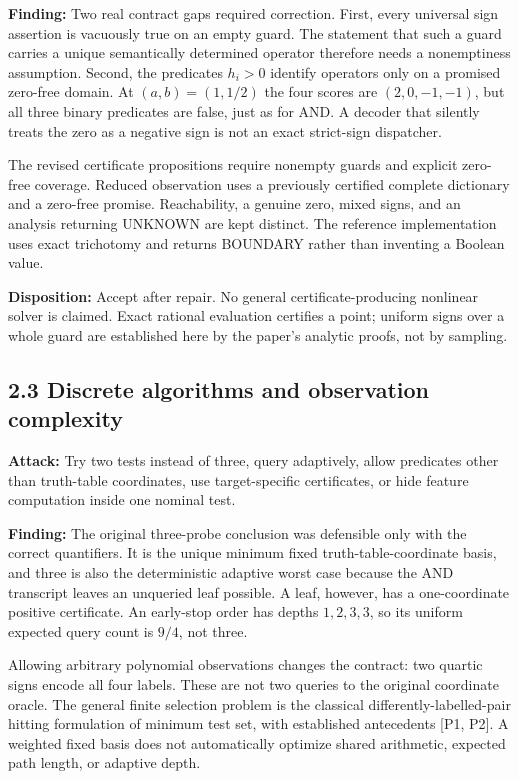 \documentclass[
  11pt,
]{article}
\begin{document}
\textbf{Finding:} Two real contract gaps required correction. First,
every universal sign assertion is vacuously true on an empty guard. The
statement that such a guard carries a unique semantically determined
operator therefore needs a nonemptiness assumption. Second, the
predicates \(h_i>0\) identify operators only on a promised zero-free
domain. At \((a,b)=(1,1/2)\) the four scores are \((2,0,-1,-1)\), but
all three binary predicates are false, just as for AND. A decoder that
silently treats the zero as a negative sign is not an exact strict-sign
dispatcher.

The revised certificate propositions require nonempty guards and
explicit zero-free coverage. Reduced observation uses a previously
certified complete dictionary and a zero-free promise. Reachability, a
genuine zero, mixed signs, and an analysis returning UNKNOWN are kept
distinct. The reference implementation uses exact trichotomy and returns
BOUNDARY rather than inventing a Boolean value.

\textbf{Disposition:} Accept after repair. No general
certificate-producing nonlinear solver is claimed. Exact rational
evaluation certifies a point; uniform signs over a whole guard are
established here by the paper's analytic proofs, not by sampling.

\subsection{2.3 Discrete algorithms and observation
complexity}\label{discrete-algorithms-and-observation-complexity}

\textbf{Attack:} Try two tests instead of three, query adaptively, allow
predicates other than truth-table coordinates, use target-specific
certificates, or hide feature computation inside one nominal test.

\textbf{Finding:} The original three-probe conclusion was defensible
only with the correct quantifiers. It is the unique minimum fixed
truth-table-coordinate basis, and three is also the deterministic
adaptive worst case because the AND transcript leaves an unqueried leaf
possible. A leaf, however, has a one-coordinate positive certificate. An
early-stop order has depths \(1,2,3,3\), so its uniform expected query
count is \(9/4\), not three.

Allowing arbitrary polynomial observations changes the contract: two
quartic signs encode all four labels. These are not two queries to the
original coordinate oracle. The general finite selection problem is the
classical differently-labelled-pair hitting formulation of minimum test
set, with established antecedents {[}P1, P2{]}. A weighted fixed basis
does not automatically optimize shared arithmetic, expected path length,
or adaptive depth.
\end{document}
